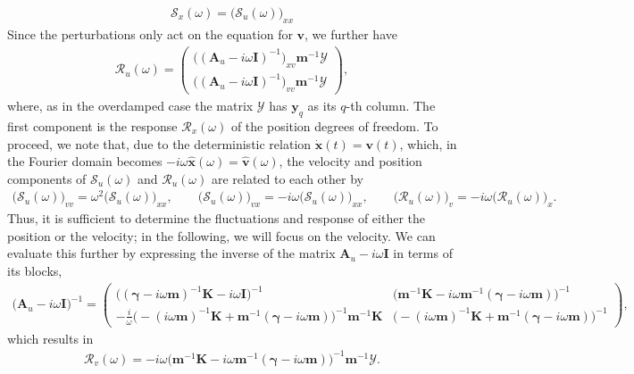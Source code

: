 \documentclass[aps,pre,twocolumn,superscriptaddress,notitlepage]{revtex4-2}
\newcommand{\bmc}[1]{\bm{\mathcal{#1}}}
\begin{document}
\begin{align}
\bmc{S}_x(\omega) = \big(\bmc{S}_u(\omega) \big)_{xx}
\end{align}
Since the perturbations only act on the equation for $\bm{v}$, we further have
\begin{align}
\bmc{R}_u(\omega) = \begin{pmatrix} \big(( \bm{A}_u - i \omega \bm{I})^{-1} \big)_{xv} \bm{m}^{-1} \bmc{Y} \\ \big(( \bm{A}_u - i \omega \bm{I})^{-1} \big)_{vv} \bm{m}^{-1} \bmc{Y}  \end{pmatrix}, \label{response-linear-under}
\end{align}
where, as in the overdamped case the matrix $\bmc{Y}$ has $\bm{y}_q$ as its $q$-th column.
The first component is the response $\bmc{R}_x(\omega)$ of the position degrees of freedom.
To proceed, we note that, due to the deterministic relation $\dot{\bm{x}}(t) = \bm{v}(t)$, which, in the Fourier domain becomes $-i \omega \hat{\bm{x}}(\omega) = \hat{\bm{v}}(\omega)$, the velocity and position components of $\bmc{S}_u(\omega)$ and $\bmc{R}_u(\omega)$ are related to each other by
\begin{align}
\big(\bmc{S}_u(\omega) \big)_{vv} = \omega^2 \big(\bmc{S}_u(\omega) \big)_{xx}, \qquad \big(\bmc{S}_u(\omega) \big)_{vx} = -i \omega \big(\bmc{S}_u(\omega) \big)_{xx},   \qquad \big( \bmc{R}_u(\omega) \big)_v = - i \omega \big( \bmc{R}_u(\omega) \big)_x .
\end{align}
Thus, it is sufficient to determine the fluctuations and response of either the position or the velocity; in the following, we will focus on the velocity.
We can evaluate this further by expressing the inverse of the matrix $\bm{A}_u - i \omega \bm{I}$ in terms of its blocks,
\begin{align}
\big(\bm{A}_u - i \omega \bm{I} \big)^{-1} = \begin{pmatrix}
\big( ( \bm{\gamma} - i \omega \bm{m} )^{-1} \bm{K} - i \omega \bm{I} \big)^{-1}
& \big( \bm{m}^{-1} \bm{K} - i \omega \bm{m}^{-1} (\bm{\gamma} - i \omega \bm{m}) \big)^{-1} \\
- \frac{i}{\omega} \big( -(i \omega \bm{m})^{-1} \bm{K} + \bm{m}^{-1}(\bm{\gamma} - i \omega \bm{m}) \big)^{-1} \bm{m}^{-1} \bm{K}
& \big( -(i \omega \bm{m})^{-1} \bm{K} + \bm{m}^{-1}(\bm{\gamma} - i \omega \bm{m}) \big)^{-1}  \end{pmatrix},
\end{align}
which results in
\begin{align}
\bmc{R}_v(\omega) = - i \omega \big( \bm{m}^{-1} \bm{K} - i \omega \bm{m}^{-1} (\bm{\gamma} - i \omega \bm{m}) \big)^{-1} \bm{m}^{-1} \bmc{Y} .
\end{align}
\end{document}
